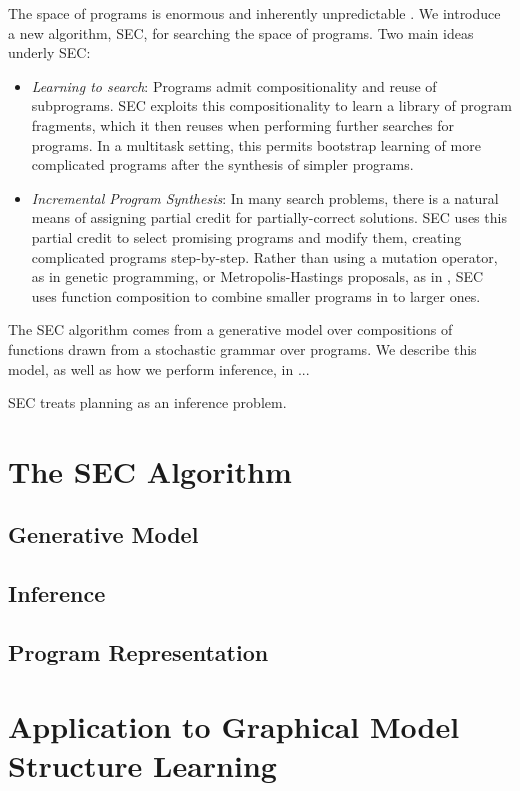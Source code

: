 \documentclass{article} %
\begin{document}
The space of programs is enormous and inherently unpredictable \cite{PACunpredictability}.
We introduce a new algorithm, SEC, for searching the space of programs.
Two main ideas underly SEC:
\begin{itemize}
\item \emph{Learning to search}: Programs admit compositionality and reuse of subprograms. SEC exploits this compositionality to learn a library of program fragments, which it then reuses when performing further searches for programs.
In a multitask setting, this permits bootstrap learning of more complicated programs after the synthesis of simpler programs.
\item \emph{Incremental Program Synthesis}: In many search problems, there is a natural means of assigning partial credit for partially-correct solutions. SEC uses this partial credit to select promising programs and modify them, creating complicated programs step-by-step.
Rather than using a mutation operator, as in genetic programming, or Metropolis-Hastings proposals, as in \cite{MHprogramInduction}, SEC uses function composition to combine smaller programs in to larger ones.
\end{itemize}

The SEC algorithm comes from a generative model over compositions of functions drawn from a stochastic grammar over programs.
We describe this model, as well as how we perform inference, in ...

SEC treats planning as an inference problem.

\section{The SEC Algorithm}
\subsection{Generative Model}
\subsection{Inference}
\subsection{Program Representation}

\section{Application to Graphical Model Structure Learning}
\end{document}
